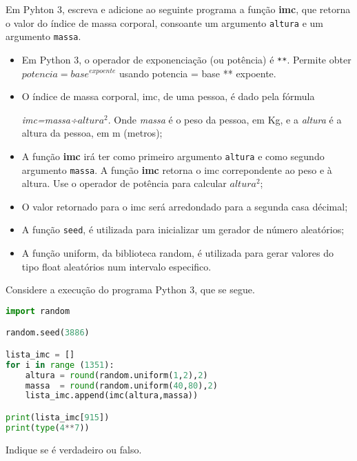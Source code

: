 \documentclass[12pt,varwidth=16cm,border=17pt]{standalone}
\begin{document}
Em Pyhton 3, escreva e adicione ao seguinte programa a função \textbf{imc}, que retorna o valor do índice de massa corporal, consoante um argumento \verb+altura+ e um argumento \verb+massa+.
\begin{itemize}
    
  \item Em Python 3, o operador de exponenciação (ou potência) é \verb+**+. Permite obter $potencia=base^{expoente}$ usando potencia = base ** expoente.
  
  
  
  \item  O índice de massa corporal, imc, de uma pessoa, é dado pela fórmula

  \emph{imc=massa÷$altura^2$}. Onde \emph{massa} é o peso da pessoa, em Kg, e a \emph{altura} é a altura da pessoa, em m (metros);
  \item A função \textbf{imc} irá ter como primeiro argumento \verb+altura+ e como segundo argumento \verb+massa+. A função \textbf{imc} retorna o imc correpondente ao peso e à altura. Use o operador de potência para calcular $altura^2$;
  \item O valor retornado para o imc será arredondado para a segunda casa décimal;
  \item A função \verb+seed+, é utilizada para inicializar um gerador de número aleatórios;
  \item A função uniform, da biblioteca random, é utilizada para gerar valores do tipo float aleatórios num intervalo especifico.
  
  

    
\end{itemize}




Considere a execução do programa Python 3, que se segue. 

\begin{lstlisting}[language=Python]
import random

random.seed(3886)

lista_imc = []
for i in range (1351):
    altura = round(random.uniform(1,2),2)
    massa  = round(random.uniform(40,80),2)
    lista_imc.append(imc(altura,massa))

print(lista_imc[915])
print(type(4**7))
\end{lstlisting}

Indique se é verdadeiro ou falso.
\end{document}
